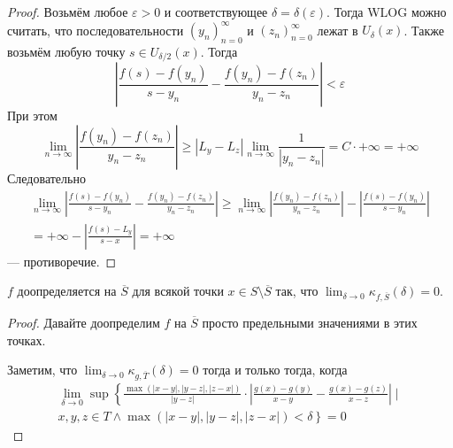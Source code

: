 \documentclass[12pt,a4paper]{article}
\begin{document}
\begin{enumproblem}
\begin{proof}
            Возьмём любое $\varepsilon > 0$ и соответствующее $\delta = \delta(\varepsilon)$. Тогда WLOG можно считать, что последовательности $(y_n)_{n=0}^\infty$ и $(z_n)_{n=0}^\infty$ лежат в $U_\delta(x)$. Также возьмём любую точку $s \in U_{\delta/2}(x)$. Тогда
            \[
                \left|\frac{f(s)-f(y_n)}{s-y_n} - \frac{f(y_n)-f(z_n)}{y_n-z_n}\right| < \varepsilon
            \]
            При этом
            \[
                \lim_{n \to \infty} \left|\frac{f(y_n)-f(z_n)}{y_n-z_n}\right|
                \geqslant |L_y-L_z| \lim_{n \to \infty} \frac{1}{|y_n-z_n|}
                = C \cdot +\infty
                = +\infty
            \]
            Следовательно
            \begin{multline*}
                \lim_{n \to \infty} \left|\frac{f(s)-f(y_n)}{s-y_n} - \frac{f(y_n)-f(z_n)}{y_n-z_n}\right|
                \geqslant \lim_{n \to \infty} \left|\frac{f(y_n)-f(z_n)}{y_n-z_n}\right| - \left|\frac{f(s)-f(y_n)}{s-y_n}\right|\\
                = +\infty - \left|\frac{f(s) - L_y}{s - x}\right|
                = +\infty
            \end{multline*}
            --- противоречие.
        \end{proof}

        \begin{lemma}
            $f$ доопределяется на $\overline{S}$ для всякой точки $x \in S \setminus \overline{S}$ так, что $\lim_{\delta \to 0} \kappa_{f, \overline{S}}(\delta) = 0$.
        \end{lemma}

        \begin{proof}
            Давайте доопределим $f$ на $\overline{S}$ просто предельными значениями в этих точках.

            Заметим, что $\lim_{\delta \to 0} \kappa_{g, \overline{T}}(\delta) = 0$ тогда и только тогда, когда
            \begin{multline*}
                \lim_{\delta \to 0} \sup \left\{\frac{\max(|x-y|, |y-z|, |z-x|)}{|y-z|} \cdot \left|\frac{g(x)-g(y)}{x-y} - \frac{g(x)-g(z)}{x-z}\right| \mid\right.\\
                \left. x, y, z \in T \wedge \max(|x-y|, |y-z|, |z-x|) < \delta\right\} = 0
            \end{multline*}


\end{proof}
\end{enumproblem}
\end{document}
